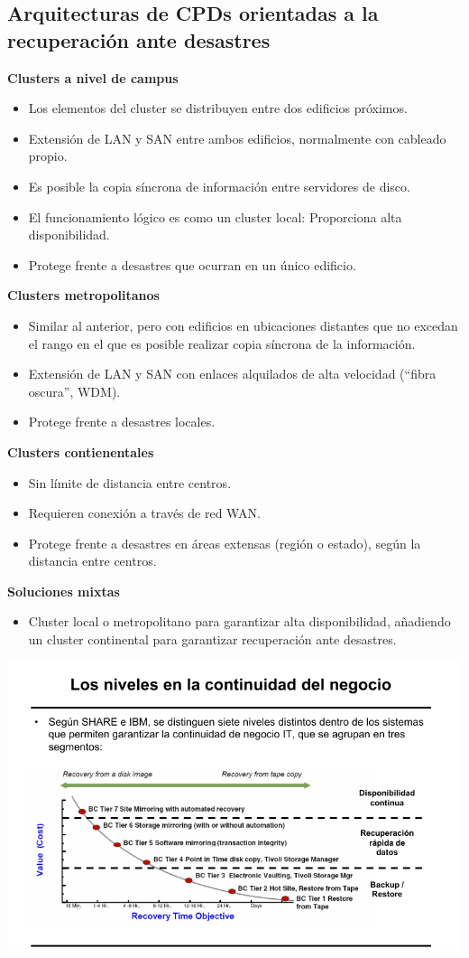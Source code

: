 \documentclass{apuntes}[nochap]
\begin{document}
\subsection{Arquitecturas de CPDs orientadas a la recuperación ante desastres}
\textbf{Clusters a nivel de campus}
\begin{itemize}
\item Los elementos del cluster se distribuyen entre dos edificios próximos.
\item Extensión de LAN y SAN entre ambos edificios, normalmente con cableado propio.
\item Es posible la copia síncrona de información entre servidores de disco.
\item El funcionamiento lógico es como un cluster local: Proporciona alta disponibilidad.
\item Protege frente a desastres que ocurran en un único edificio.

\end{itemize}

\textbf{Clusters metropolitanos}
\begin{itemize}
\item Similar al anterior, pero con edificios en ubicaciones distantes que no excedan el rango en el que es posible realizar copia síncrona de la información.
\item Extensión de LAN y SAN con enlaces alquilados de alta velocidad (“fibra oscura”, WDM).
\item Protege frente a desastres locales.

\end{itemize}

\textbf{Clusters contienentales}
\begin{itemize}
\item Sin límite de distancia entre centros.
\item Requieren conexión a través de red WAN.
\item Protege frente a desastres en áreas extensas (región o estado), según la distancia entre centros.

\end{itemize}
\newpage
\textbf{Soluciones mixtas}
\begin{itemize}
\item Cluster local o metropolitano para garantizar alta disponibilidad, añadiendo un cluster continental para garantizar recuperación ante desastres.

\end{itemize}

\begin{center}
\includegraphics[width=\linewidth]{img/continuidad_negocio.png}
\end{center}
\printindex
\end{document}
